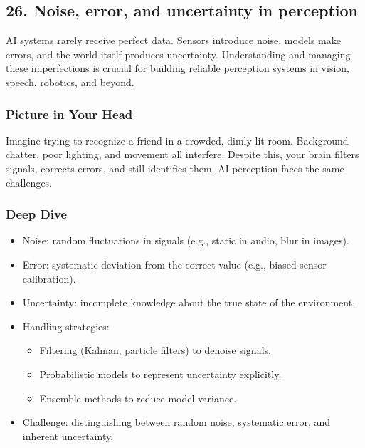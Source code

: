 \documentclass[
  letterpaper,
  DIV=11,
  numbers=noendperiod]{scrreprt}
\providecommand{\tightlist}{%
  \setlength{\itemsep}{0pt}\setlength{\parskip}{0pt}}
\begin{document}
\subsection{26. Noise, error, and uncertainty in
perception}\label{noise-error-and-uncertainty-in-perception}

AI systems rarely receive perfect data. Sensors introduce noise, models
make errors, and the world itself produces uncertainty. Understanding
and managing these imperfections is crucial for building reliable
perception systems in vision, speech, robotics, and beyond.

\subsubsection{Picture in Your Head}\label{picture-in-your-head-25}

Imagine trying to recognize a friend in a crowded, dimly lit room.
Background chatter, poor lighting, and movement all interfere. Despite
this, your brain filters signals, corrects errors, and still identifies
them. AI perception faces the same challenges.

\subsubsection{Deep Dive}\label{deep-dive-25}

\begin{itemize}
\item
  Noise: random fluctuations in signals (e.g., static in audio, blur in
  images).
\item
  Error: systematic deviation from the correct value (e.g., biased
  sensor calibration).
\item
  Uncertainty: incomplete knowledge about the true state of the
  environment.
\item
  Handling strategies:

  \begin{itemize}
  \tightlist
  \item
    Filtering (Kalman, particle filters) to denoise signals.
  \item
    Probabilistic models to represent uncertainty explicitly.
  \item
    Ensemble methods to reduce model variance.
  \end{itemize}
\item
  Challenge: distinguishing between random noise, systematic error, and
  inherent uncertainty.
\end{itemize}
\end{document}
